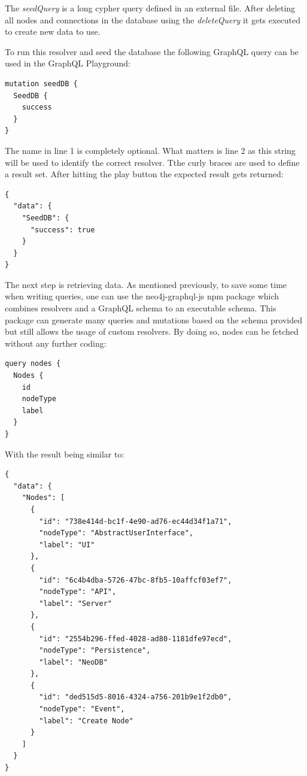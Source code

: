The \emph{seedQuery} is a long cypher query defined in an external file. After deleting all nodes and connections in the database using the \emph{deleteQuery} it gets executed to create new data to use.

To run this resolver and seed the database the following GraphQL query can be used in the GraphQL Playground:
\lstset{language=GraphQL}
\begin{lstlisting}[caption={Seeding the DB through GraphQL Playground}, label={exSeed}]
mutation seedDB {
  SeedDB {
    success
  }
}
\end{lstlisting}
The name in line 1 is completely optional. What matters is line 2 as this string will be used to identify the correct resolver. Tthe curly braces are used to define a result set. After hitting the play button the expected result gets returned:
\begin{lstlisting}[caption={Seeding Result}, label={exResSeed}]
{
  "data": {
    "SeedDB": {
      "success": true
    }
  }
}
\end{lstlisting}

The next step is retrieving data. As mentioned previously, to save some time when writing queries, one can use the neo4j-graphql-js npm package which combines resolvers and a GraphQL schema to an executable schema. This package can generate many queries and mutations based on the schema provided but still allows the usage of custom resolvers.
By doing so, nodes can be fetched without any further coding:

\begin{lstlisting}[caption={Fetching Nodes}, label={exFetch}]
query nodes {
  Nodes {
    id
    nodeType
    label
  }
}
\end{lstlisting}

With the result being similar to:
\begin{lstlisting}[caption={Result Set}, label={exResFetch}]
{
  "data": {
    "Nodes": [
      {
        "id": "738e414d-bc1f-4e90-ad76-ec44d34f1a71",
        "nodeType": "AbstractUserInterface",
        "label": "UI"
      },
      {
        "id": "6c4b4dba-5726-47bc-8fb5-10affcf03ef7",
        "nodeType": "API",
        "label": "Server"
      },
      {
        "id": "2554b296-ffed-4028-ad80-1181dfe97ecd",
        "nodeType": "Persistence",
        "label": "NeoDB"
      },
      {
        "id": "ded515d5-8016-4324-a756-201b9e1f2db0",
        "nodeType": "Event",
        "label": "Create Node"
      }
    ]
  }
}
\end{lstlisting}

